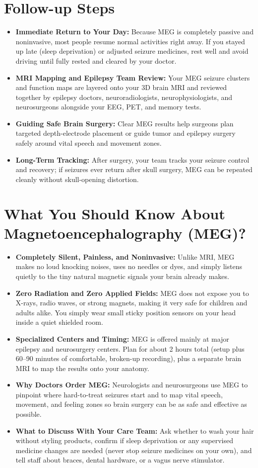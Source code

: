 \section{Follow-up Steps}
\begin{itemize}
  \item \textbf{Immediate Return to Your Day:} Because MEG is completely passive and noninvasive, most people resume normal activities right away. If you stayed up late (sleep deprivation) or adjusted seizure medicines, rest well and avoid driving until fully rested and cleared by your doctor.
  \item \textbf{MRI Mapping and Epilepsy Team Review:} Your MEG seizure clusters and function maps are layered onto your 3D brain MRI and reviewed together by epilepsy doctors, neuroradiologists, neurophysiologists, and neurosurgeons alongside your EEG, PET, and memory tests.
  \item \textbf{Guiding Safe Brain Surgery:} Clear MEG results help surgeons plan targeted depth-electrode placement or guide tumor and epilepsy surgery safely around vital speech and movement zones.
  \item \textbf{Long-Term Tracking:} After surgery, your team tracks your seizure control and recovery; if seizures ever return after skull surgery, MEG can be repeated cleanly without skull-opening distortion.
\end{itemize}

\section{What You Should Know About Magnetoencephalography (MEG)?}
\begin{itemize}
  \item \textbf{Completely Silent, Painless, and Noninvasive:} Unlike MRI, MEG makes no loud knocking noises, uses no needles or dyes, and simply listens quietly to the tiny natural magnetic signals your brain already makes.
  \item \textbf{Zero Radiation and Zero Applied Fields:} MEG does not expose you to X-rays, radio waves, or strong magnets, making it very safe for children and adults alike. You simply wear small sticky position sensors on your head inside a quiet shielded room.
  \item \textbf{Specialized Centers and Timing:} MEG is offered mainly at major epilepsy and neurosurgery centers. Plan for about 2 hours total (setup plus 60--90 minutes of comfortable, broken-up recording), plus a separate brain MRI to map the results onto your anatomy.
  \item \textbf{Why Doctors Order MEG:} Neurologists and neurosurgeons use MEG to pinpoint where hard-to-treat seizures start and to map vital speech, movement, and feeling zones so brain surgery can be as safe and effective as possible.
  \item \textbf{What to Discuss With Your Care Team:} Ask whether to wash your hair without styling products, confirm if sleep deprivation or any supervised medicine changes are needed (never stop seizure medicines on your own), and tell staff about braces, dental hardware, or a vagus nerve stimulator.
\end{itemize}


